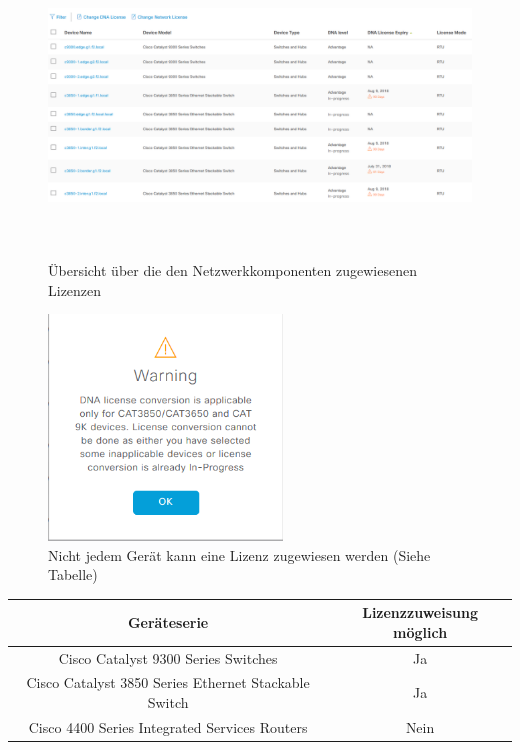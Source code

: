 \begin{figure}[H]
	\centering
	\includegraphics[height=8cm]{img/LicenceManager_003.png}
	\caption{Übersicht über die den Netzwerkkomponenten zugewiesenen Lizenzen}
	\label{fig:dna-center-licence-6}
\end{figure}

\begin{figure}[H]
	\centering
	\includegraphics[height=6cm]{img/LicenceManager_004.png}
	\caption{Nicht jedem Gerät kann eine Lizenz zugewiesen werden (Siehe Tabelle)}
	\label{fig:dna-center-licence-7}
\end{figure}

\begin{table}[H]
	\centering
		\begin{tabular}{ | c | c | }
		\hline
		\rowcolor{gray!50}
		\textbf{Geräteserie} & 	\textbf{Lizenzzuweisung möglich} \\
		\hline
		Cisco Catalyst 9300 Series Switches & Ja \\
		\hline
		Cisco Catalyst 3850 Series Ethernet Stackable Switch & Ja \\
		\hline
		Cisco 4400 Series Integrated Services Routers & Nein \\
		\hline
	\end{tabular}
\end{table}

